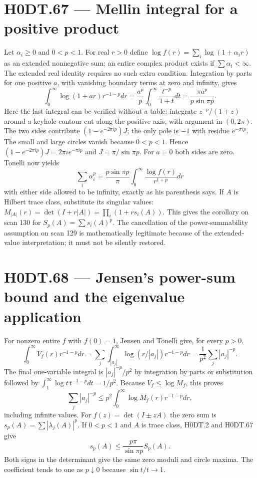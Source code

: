 \section*{H0DT.67 --- Mellin integral for a positive product}
Let $\alpha_i\ge0$ and $0<p<1$. For real $r>0$ define $\log f(r)=\sum_i\log(1+\alpha_i r)$ as an extended nonnegative sum; an entire complex product exists if $\sum\alpha_i<\infty$. The extended real identity requires no such extra condition. Integration by parts for one positive $a$, with vanishing boundary terms at zero and infinity, gives
\[
 \int_0^\infty\log(1+ar)r^{-1-p}dr
 =\frac{a^p}{p}\int_0^\infty\frac{t^{-p}}{1+t}dt
 =\frac{\pi a^p}{p\sin\pi p}.
\]
Here the last integral can be verified without a table: integrate $z^{-p}/(1+z)$ around a keyhole contour cut along the positive axis, with argument in $(0,2\pi)$. The two sides contribute $(1-e^{-2\pi ip})J$; the only pole is $-1$ with residue $e^{-\pi ip}$. The small and large circles vanish because $0<p<1$. Hence $(1-e^{-2\pi ip})J=2\pi i e^{-\pi ip}$ and $J=\pi/\sin\pi p$. For $a=0$ both sides are zero. Tonelli now yields
\[
 \sum_i\alpha_i^p=\frac{p\sin\pi p}{\pi}
 \int_0^\infty\frac{\log f(r)}{r^{1+p}}dr
\]
with either side allowed to be infinity, exactly as his parenthesis says. If $A$ is Hilbert trace class, substitute its singular values: $M_{|A|}(r)=\det(I+r|A|)=\prod_i(1+rs_i(A))$. This gives the corollary on scan 130 for $S_p(A)=\sum s_i(A)^p$. The cancellation of the power-summability assumption on scan 129 is mathematically legitimate because of the extended-value interpretation; it must not be silently restored.

\section*{H0DT.68 --- Jensen's power-sum bound and the eigenvalue application}
For nonzero entire $f$ with $f(0)=1$, Jensen and Tonelli give, for every $p>0$,
\[
 \int_0^\infty V_f(r)r^{-1-p}dr
 =\sum_j\int_{|a_j|}^\infty\log(r/|a_j|)r^{-1-p}dr
 =\frac1{p^2}\sum_j|a_j|^{-p}.
\]
The final one-variable integral is $|a_j|^{-p}/p^2$ by integration by parts or substitution followed by $\int_1^\infty\log t\,t^{-1-p}dt=1/p^2$. Because $V_f\le\log M_f$, this proves
\[
 \sum_j|a_j|^{-p}\le p^2\int_0^\infty\log M_f(r)r^{-1-p}dr,
\]
including infinite values. For $f(z)=\det(I\pm zA)$ the zero sum is $s_p(A)=\sum|\lambda_j(A)|^p$. If $0<p<1$ and $A$ is trace class, H0DT.2 and H0DT.67 give
\[
 s_p(A)\le\frac{p\pi}{\sin\pi p}S_p(A).
\]
Both signs in the determinant give the same zero moduli and circle maxima. The coefficient tends to one as $p\downarrow0$ because $\sin t/t\to1$.

